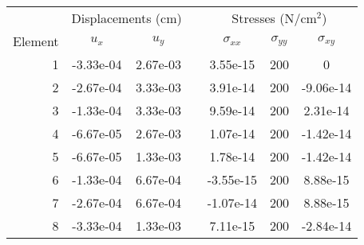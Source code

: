 \begin{tabular}{@{} r cc c ccc @{}}
    \toprule
     & \multicolumn{2}{c}{Displacements (cm)} & \phantom{a} & \multicolumn{3}{c}{Stresses (N/cm$^2$)}\\
    \cmidrule{2-3} \cmidrule{5-7}
    Element & $u_x$ & $u_y$ & & $\sigma_{xx}$ & $\sigma_{yy}$ & $\sigma_{xy}$ \\
    \midrule

1 & -3.33e-04 & 2.67e-03 &  & 3.55e-15 & 200 & 0 \\
2 & -2.67e-04 & 3.33e-03 &  & 3.91e-14 & 200 & -9.06e-14 \\
3 & -1.33e-04 & 3.33e-03 &  & 9.59e-14 & 200 & 2.31e-14 \\
4 & -6.67e-05 & 2.67e-03 &  & 1.07e-14 & 200 & -1.42e-14 \\
5 & -6.67e-05 & 1.33e-03 &  & 1.78e-14 & 200 & -1.42e-14 \\
6 & -1.33e-04 & 6.67e-04 &  & -3.55e-15 & 200 & 8.88e-15 \\
7 & -2.67e-04 & 6.67e-04 &  & -1.07e-14 & 200 & 8.88e-15 \\
8 & -3.33e-04 & 1.33e-03 &  & 7.11e-15 & 200 & -2.84e-14 \\

    \bottomrule
\end{tabular}